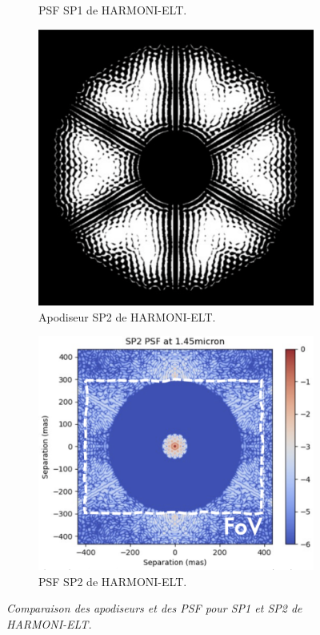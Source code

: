 \begin{figure}[htbp]
\begin{subfigure}[b]{0.45\textwidth}
\caption{PSF SP1 de HARMONI-ELT.}
\label{fig:PSF_SP1}
\end{subfigure}
\begin{subfigure}[b]{0.40\textwidth}
    \centering
    \includegraphics[width=\textwidth]{figures/SP2_HARMONI.png}
    \caption{Apodiseur SP2 de HARMONI-ELT.}
    \label{fig:SP2}
\end{subfigure}
\hfill %
\begin{subfigure}[b]{0.45\textwidth}
    \centering
    \includegraphics[width=\textwidth]{figures/PSF_SP2_HARMONI.png}
    \caption{PSF SP2 de HARMONI-ELT.}
    \label{fig:PSF_SP2}
\end{subfigure}

\caption{\textit{Comparaison des apodiseurs et des PSF pour SP1 et SP2 de HARMONI-ELT.}}
\end{figure}

